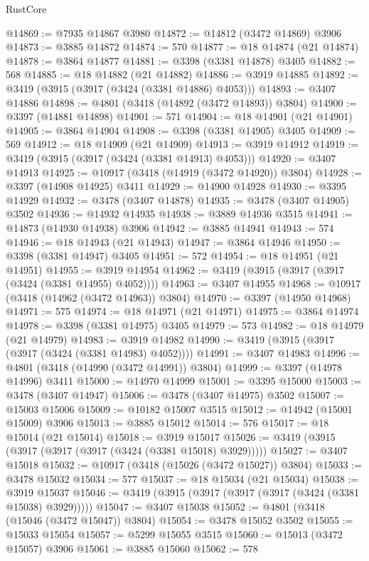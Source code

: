 \begin{lexlean}{RustCore}
\begin{coremodule}
@14869 := @7935 @14867 @3980
@14872 := @14812 (@3472 @14869) @3906
@14873 := @3885 @14872
@14874 := 570
@14877 := @18 @14874 (@21 @14874)
@14878 := @3864 @14877
@14881 := @3398 (@3381 @14878) @3405
@14882 := 568
@14885 := @18 @14882 (@21 @14882)
@14886 := @3919 @14885
@14892 := @3419 (@3915 (@3917 (@3424 (@3381 @14886) @4053)))
@14893 := @3407 @14886
@14898 := @4801 (@3418 (@14892 (@3472 @14893)) @3804)
@14900 := @3397 (@14881 @14898)
@14901 := 571
@14904 := @18 @14901 (@21 @14901)
@14905 := @3864 @14904
@14908 := @3398 (@3381 @14905) @3405
@14909 := 569
@14912 := @18 @14909 (@21 @14909)
@14913 := @3919 @14912
@14919 := @3419 (@3915 (@3917 (@3424 (@3381 @14913) @4053)))
@14920 := @3407 @14913
@14925 := @10917 (@3418 (@14919 (@3472 @14920)) @3804)
@14928 := @3397 (@14908 @14925) @3411
@14929 := @14900 @14928
@14930 := @3395 @14929
@14932 := @3478 (@3407 @14878)
@14935 := @3478 (@3407 @14905) @3502
@14936 := @14932 @14935
@14938 := @3889 @14936 @3515
@14941 := @14873 (@14930 @14938) @3906
@14942 := @3885 @14941
@14943 := 574
@14946 := @18 @14943 (@21 @14943)
@14947 := @3864 @14946
@14950 := @3398 (@3381 @14947) @3405
@14951 := 572
@14954 := @18 @14951 (@21 @14951)
@14955 := @3919 @14954
@14962 := @3419 (@3915 (@3917 (@3917 (@3424 (@3381 @14955) @4052))))
@14963 := @3407 @14955
@14968 := @10917 (@3418 (@14962 (@3472 @14963)) @3804)
@14970 := @3397 (@14950 @14968)
@14971 := 575
@14974 := @18 @14971 (@21 @14971)
@14975 := @3864 @14974
@14978 := @3398 (@3381 @14975) @3405
@14979 := 573
@14982 := @18 @14979 (@21 @14979)
@14983 := @3919 @14982
@14990 := @3419 (@3915 (@3917 (@3917 (@3424 (@3381 @14983) @4052))))
@14991 := @3407 @14983
@14996 := @4801 (@3418 (@14990 (@3472 @14991)) @3804)
@14999 := @3397 (@14978 @14996) @3411
@15000 := @14970 @14999
@15001 := @3395 @15000
@15003 := @3478 (@3407 @14947)
@15006 := @3478 (@3407 @14975) @3502
@15007 := @15003 @15006
@15009 := @10182 @15007 @3515
@15012 := @14942 (@15001 @15009) @3906
@15013 := @3885 @15012
@15014 := 576
@15017 := @18 @15014 (@21 @15014)
@15018 := @3919 @15017
@15026 := @3419 (@3915 (@3917 (@3917 (@3917 (@3424 (@3381 @15018) @3929)))))
@15027 := @3407 @15018
@15032 := @10917 (@3418 (@15026 (@3472 @15027)) @3804)
@15033 := @3478 @15032
@15034 := 577
@15037 := @18 @15034 (@21 @15034)
@15038 := @3919 @15037
@15046 := @3419 (@3915 (@3917 (@3917 (@3917 (@3424 (@3381 @15038) @3929)))))
@15047 := @3407 @15038
@15052 := @4801 (@3418 (@15046 (@3472 @15047)) @3804)
@15054 := @3478 @15052 @3502
@15055 := @15033 @15054
@15057 := @5299 @15055 @3515
@15060 := @15013 (@3472 @15057) @3906
@15061 := @3885 @15060
@15062 := 578

\end{coremodule}
\end{lexlean}

